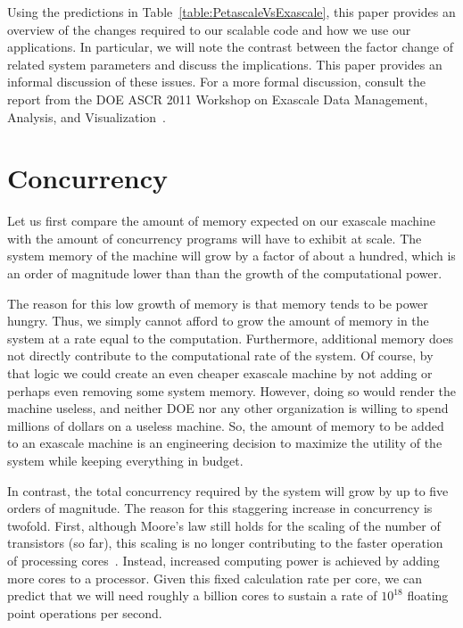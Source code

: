\documentclass[conference]{IEEEtran}
\newcommand*{\lcite}[1]{~\cite{#1}}
\begin{document}
Using the predictions in Table~\ref{table:PetascaleVsExascale}, this paper
provides an overview of the changes required to our scalable code and how
we use our applications.  In particular, we will note the contrast between
the factor change of related system parameters and discuss the
implications.  This paper provides an informal discussion of these issues.
For a more formal discussion, consult the report from the DOE ASCR 2011
Workshop on Exascale Data Management, Analysis, and
Visualization\lcite{ScientificDiscoveryExascale2011}.

\section{Concurrency}
\label{sec:Concurrency}

\noindent
Let us first compare the amount of memory expected on our exascale machine
with the amount of concurrency programs will have to exhibit at scale.  The
system memory of the machine will grow by a factor of about a hundred,
which is an order of magnitude lower than than the growth of the
computational power.

The reason for this low growth of memory is that memory tends to be power
hungry.  Thus, we simply cannot afford to grow the amount of memory in the
system at a rate equal to the computation.  Furthermore, additional memory
does not directly contribute to the computational rate of the system.  Of
course, by that logic we could create an even cheaper exascale machine by
not adding or perhaps even removing some system memory.  However, doing so
would render the machine useless, and neither DOE nor any other
organization is willing to spend millions of dollars on a useless machine.
So, the amount of memory to be added to an exascale machine is an
engineering decision to maximize the utility of the system while keeping
everything in budget.

In contrast, the total concurrency required by the system will grow by up
to five orders of magnitude.  The reason for this staggering increase in
concurrency is twofold.  First, although Moore's law still holds for the
scaling of the number of transistors (so far), this scaling is no longer
contributing to the faster operation of processing
cores\lcite{ExascaleRoadMap}.  Instead, increased computing power is
achieved by adding more cores to a processor.  Given this fixed calculation
rate per core, we can predict that we will need roughly a billion cores to
sustain a rate of $10^{18}$ floating point operations per second.
\end{document}
